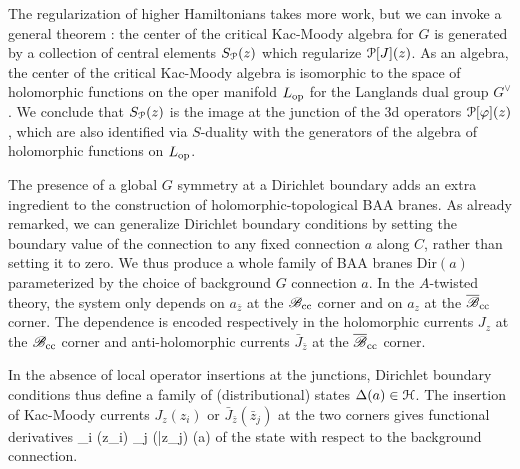 \documentclass[11pt,a4paper]{article}
\begin{document}
The regularization of higher Hamiltonians takes more work, but we can invoke a general theorem \cite{BD}: the center of the critical Kac-Moody algebra for $G$ is generated by a collection of central elements $S_{\P}(z)$ which regularize ${\cal P}[J](z)$. As an algebra, the center of the critical Kac-Moody algebra is isomorphic to the space of holomorphic functions on the oper manifold $L_\op$ for the Langlands dual group $G^\vee$. We conclude that $S_{\P}(z)$ is the image at the junction of the 3d operators ${\cal P}[\varphi](z)$, which are also identified via $S$-duality with the generators of the algebra of holomorphic functions on $L_\op$. 

The presence of a global $G$ symmetry at a Dirichlet boundary adds an extra ingredient to the construction of holomorphic-topological BAA branes.   As already
remarked, we can generalize
Dirichlet boundary conditions by setting the boundary value of the connection to any fixed connection $a$ along $C$, rather than setting it to zero.
We thus produce a whole family of 
BAA branes $\mathrm{Dir}(a)$ parameterized by the choice of background $G$ connection $a$. In the $A$-twisted theory, the 
system only depends on $a_{\bar z}$ at the $\B_\cc$ corner and on $a_z$ at the $\bar \B_\cc$ corner. The dependence is encoded respectively in the holomorphic currents $J_z$ at the $\B_\cc$ corner and  anti-holomorphic currents $\bar J_{\bar z}$ at the $\bar \B_\cc$ corner.

In the absence of local operator insertions at the junctions, Dirichlet boundary conditions thus define a family of (distributional) states 
$\Delta(a) \in \H$. The insertion of Kac-Moody currents $J_z(z_i)$ or $\bar J_{\bar z}(\bar z_j)$ at the two corners gives functional derivatives
\be
\prod_i (z_i) \prod_j (\bar z_j) \Delta(a)
\ee 
of the state with respect to the background connection. 
 
\end{document}
